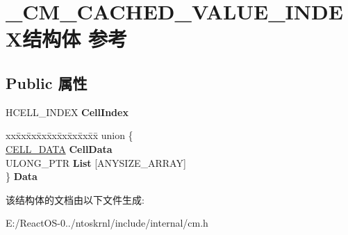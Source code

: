 \hypertarget{struct___c_m___c_a_c_h_e_d___v_a_l_u_e___i_n_d_e_x}{}\section{\+\_\+\+C\+M\+\_\+\+C\+A\+C\+H\+E\+D\+\_\+\+V\+A\+L\+U\+E\+\_\+\+I\+N\+D\+E\+X结构体 参考}
\label{struct___c_m___c_a_c_h_e_d___v_a_l_u_e___i_n_d_e_x}
\subsection*{Public 属性}
\begin{DoxyCompactItemize}
\item 
\mbox{\label{struct___c_m___c_a_c_h_e_d___v_a_l_u_e___i_n_d_e_x_aa47c50cb8baf78c5dd6e19c469df2d0d}} 
H\+C\+E\+L\+L\+\_\+\+I\+N\+D\+EX {\bfseries Cell\+Index}
\item 
\mbox{\label{struct___c_m___c_a_c_h_e_d___v_a_l_u_e___i_n_d_e_x_a25c0b56a60fdd26d3b7a3c56633dfc5e}} 
\begin{tabbing}
xx\=xx\=xx\=xx\=xx\=xx\=xx\=xx\=xx\=\kill
union \{\\
\>\hyperlink{struct___c_e_l_l___d_a_t_a}{CELL\_DATA} {\bfseries CellData}\\
\>ULONG\_PTR {\bfseries List} \mbox{[}ANYSIZE\_ARRAY\mbox{]}\\
\} {\bfseries Data}\\

\end{tabbing}\end{DoxyCompactItemize}


该结构体的文档由以下文件生成\+:\begin{DoxyCompactItemize}
\item 
E\+:/\+React\+O\+S-\/0../ntoskrnl/include/internal/cm.\+h\end{DoxyCompactItemize}
